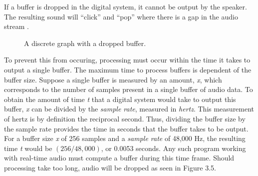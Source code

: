 If a buffer is dropped in the digital system, it cannot be output by the speaker. The resulting sound will ``click'' and ``pop'' where there is a gap in the audio stream \cite{Walker_2005}.

\begin{figure}[h] %
	\begin{center}
		\caption{A discrete graph with a dropped buffer.}
	\end{center}
\end{figure}

To prevent this from occuring, processing must occur within the time it takes to output a single buffer. The maximum time to process buffers is dependent of the buffer size. Suppose a single buffer is measured by an amount, \textit{x}, which corresponds to the number of samples present in a single buffer of audio data. To obtain the amount of time \textit{t} that a digital system would take to output this buffer, \textit{x} can be divided by the \textit{sample rate}, measured in \textit{hertz}. This measurement of hertz is by definition the reciprocal second. Thus, dividing the buffer size by the sample rate provides the time in seconds that the buffer takes to be output. For a buffer size \textit{x} of 256 samples and a \textit{sample rate} of 48,000 Hz, the resulting time \textit{t} would be $(256 / 48,000)$, or 0.0053 seconds. Any such program working with real-time audio must compute a buffer during this time frame. Should processing take too long, audio will be dropped as seen in Figure 3.5.

